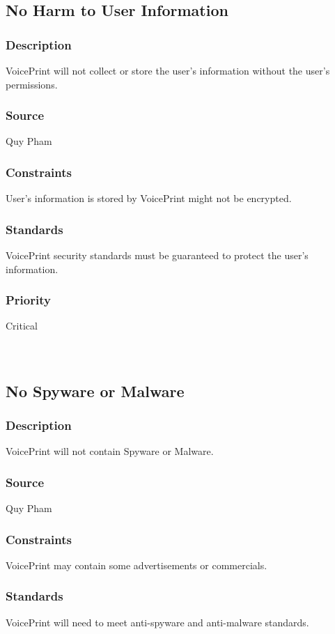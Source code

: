 \subsection{No Harm to User Information}
\subsubsection{Description}
VoicePrint will not collect or store the user's information without the user's permissions.
\subsubsection{Source}
Quy Pham
\subsubsection{Constraints}
User's information is stored by VoicePrint might not be encrypted.
\subsubsection{Standards}
VoicePrint security standards must be guaranteed to protect the user's information.
\subsubsection{Priority}
Critical\\
\\
\\

\subsection{No Spyware or Malware}
\subsubsection{Description}
VoicePrint will not contain Spyware or Malware.
\subsubsection{Source}
Quy Pham
\subsubsection{Constraints}
VoicePrint may contain some advertisements or commercials.
\subsubsection{Standards}
VoicePrint will need to meet anti-spyware and anti-malware standards.

